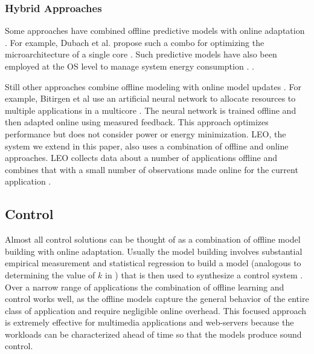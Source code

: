 \subsubsection{Hybrid Approaches}
Some approaches have combined offline predictive models with online
adaptation
\cite{Zhang2012,packandcap,Winter2010,dubach2010,Koala,Cinder,
  wu2012inferred}.  For example, Dubach et al.  propose such a combo
for optimizing the microarchitecture of a single core
\cite{dubach2010}.  Such predictive models have also been employed at
the OS level to manage system energy consumption \cite{Koala,Cinder}.
\cite{wu2012inferred}.


Still other approaches combine offline modeling with online model
updates \cite{JouleGuard,Bitirgen2008,Ipek}.  For example, Bitirgen et
al use an artificial neural network to allocate resources to multiple
applications in a multicore \cite{Bitirgen2008}.  The neural network
is trained offline and then adapted online using measured feedback.
This approach optimizes performance but does not consider power or
energy minimization.  LEO, the system we extend in this paper, also
uses a combination of offline and online approaches.  LEO collects
data about a number of applications offline and combines that with a
small number of observations made online for the current application
\cite{LEO}.

\subsection{Control}
Almost all control solutions can be thought of as a combination of
offline model building with online adaptation.  Usually the model
building involves substantial empirical measurement and statistical
regression to build a model (analogous to determining the value of $k$
in ) that is then used to synthesize a control system
\cite{Wu2004,TCST,Chen2011,PTRADE,Heartbeats2,ControlWare,Agilos,Rajkumar,Sojka,Raghavendra2008}.
Over a narrow range of applications the combination of offline
learning and control works well, as the offline models capture the
general behavior of the entire class of application and require
negligible online overhead.  This focused approach is extremely
effective for multimedia applications
\cite{grace2,flinn99,flinn2004,xtune,TCST} and web-servers
\cite{Horvarth,LuEtAl-2006a,SunDaiPan-2008a} because the workloads can
be characterized ahead of time so that the models produce sound control.

